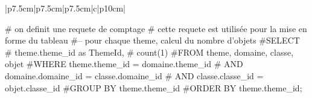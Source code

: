 \documentclass[12pt,titlepage,oneside]{book}
\begin{document}
\renewcommand{\arraystretch}{1.2}
\begin{supertabular}{|p{7.5cm}|p{7.5cm}|p{7.5cm}|c|p{10cm}|}

\begin{lbdpython}

# on definit une requete de comptage
# cette requete est utilisée pour la mise en forme du tableau
#-- pour chaque theme, calcul du nombre d'objets
#SELECT
#   theme.theme_id as ThemeId,
#   count(1)
#FROM theme, domaine, classe, objet
#WHERE theme.theme_id = domaine.theme_id 
#  AND domaine.domaine_id = classe.domaine_id
#  AND classe.classe_id = objet.classe_id
#GROUP BY theme.theme_id
#ORDER BY theme.theme_id;


\end{lbdpython}
\end{supertabular}
\end{document}
